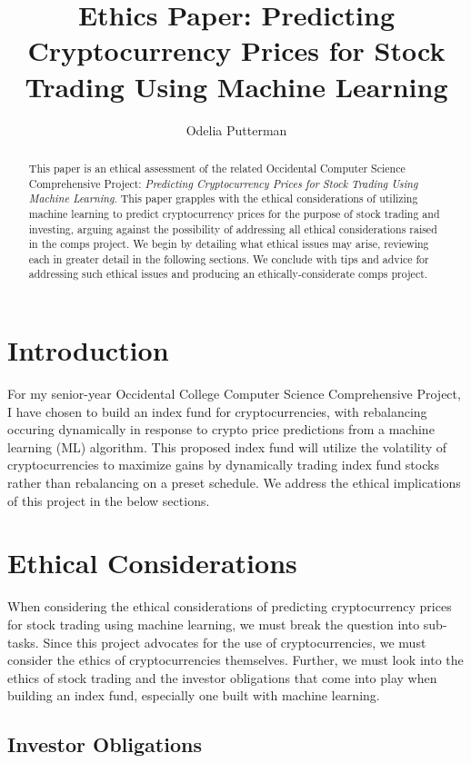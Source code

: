 \documentclass[10pt,twocolumn]{article}
\title{Ethics Paper: Predicting Cryptocurrency Prices for Stock Trading Using Machine Learning}
\author{Odelia Putterman}
\affiliation{Occidental College}
\begin{document}
\maketitle

\begin{abstract}
    This paper is an ethical assessment of the related Occidental Computer Science Comprehensive Project: \textit{Predicting Cryptocurrency Prices for Stock Trading Using Machine Learning}. This paper grapples with the ethical considerations of utilizing machine learning to predict cryptocurrency prices for the purpose of stock trading and investing, arguing against the possibility of addressing all ethical considerations raised in the comps project. We begin by detailing what ethical issues may arise, reviewing each in greater detail in the following sections. We conclude with tips and advice for addressing such ethical issues and producing an ethically-considerate comps project.
\end{abstract}

\section{Introduction}

For my senior-year Occidental College Computer Science Comprehensive Project, I have chosen to build an index fund for cryptocurrencies, with rebalancing occuring dynamically in response to crypto price predictions from a machine learning (ML) algorithm. This proposed index fund will utilize the volatility of cryptocurrencies to maximize gains by dynamically trading index fund stocks rather than rebalancing on a preset schedule. We address the ethical implications of this project in the below sections.

\section{Ethical Considerations}

When considering the ethical considerations of predicting cryptocurrency prices for stock trading using machine learning, we must break the question into sub-tasks. Since this project advocates for the use of cryptocurrencies, we must consider the ethics of cryptocurrencies themselves. Further, we must look into the ethics of stock trading and the investor obligations that come into play when building an index fund, especially one built with machine learning.

\subsection{Investor Obligations}
\end{document}
